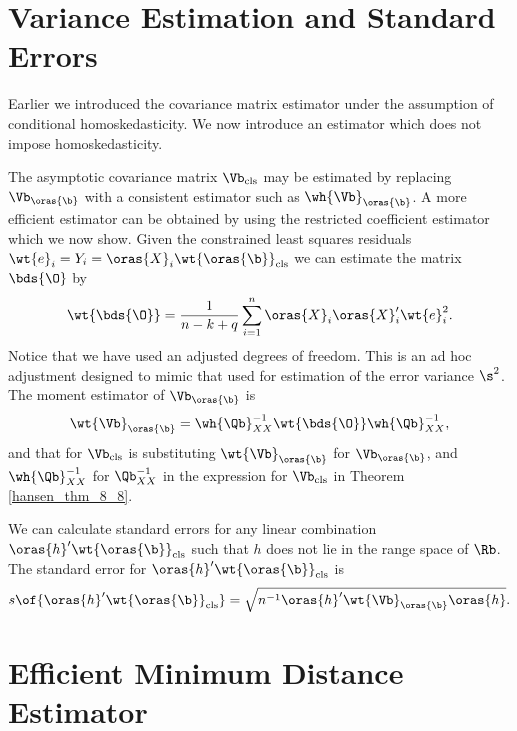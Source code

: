 \section{Variance Estimation and Standard Errors}

Earlier we introduced the covariance matrix estimator under the assumption of conditional homoskedasticity. We now introduce an estimator which does not impose homoskedasticity.

The asymptotic covariance matrix $\Vb_{\text{cls}}$ may be estimated by replacing $\Vb_{\oras{\b}}$ with a consistent estimator such as $\wh{\Vb}_{\oras{\b}}$. A more efficient estimator can be obtained by using the restricted coefficient estimator which we now show. Given the constrained least squares residuals $\wt{e}_i = Y_i = \oras{X}_i \wt{\oras{\b}}_{\text{cls}}$ we can estimate the matrix $\bds{\O}$ by 
\begin{equation}
    \notag 
    \wt{\bds{\O}} = \frac{1}{n-k+q} \sum_{i=1}^{n} \oras{X}_i \oras{X}_i^{\prime} \wt{e}_i^2.
\end{equation}
Notice that we have used an adjusted degrees of freedom. This is an ad hoc adjustment designed to mimic that used for estimation of the error variance $\s^2$. The moment estimator of $\Vb_{\oras{\b}}$ is 
\begin{equation}
    \notag 
    \wt{\Vb}_{\oras{\b}} = \wh{\Qb}_{XX}^{-1} \wt{\bds{\O}} \wh{\Qb}_{XX}^{-1}, 
\end{equation}
and that for $\Vb_{\text{cls}}$ is substituting $\wt{\Vb}_{\oras{\b}}$ for $\Vb_{\oras{\b}}$, and $\wh{\Qb}_{XX}^{-1}$ for $\Qb_{XX}^{-1}$ in the expression for $\Vb_{\text{cls}}$ in Theorem \ref{hansen_thm_8_8}.

We can calculate standard errors for any linear combination $\oras{h}^{\prime} \wt{\oras{\b}}_{\text{cls}}$ such that $h$ does not lie in the range space of $\Rb$. The standard error for $\oras{h}^{\prime} \wt{\oras{\b}}_{\text{cls}}$ is
\begin{equation}
    \notag 
    s\of{\oras{h}^{\prime} \wt{\oras{\b}}_{\text{cls}}} = \sqrt{ n^{-1} \oras{h}^{\prime} \wt{\Vb}_{\oras{\b}} \oras{h}}.
\end{equation}

\section{Efficient Minimum Distance Estimator}


